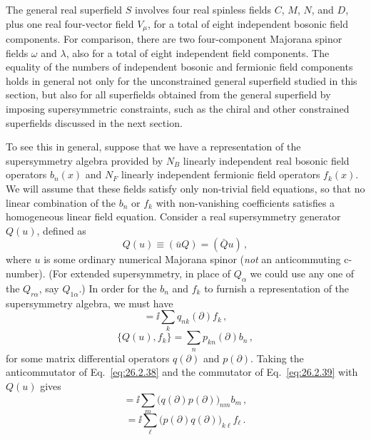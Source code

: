 The general real superfield $S$ involves four real spinless fields $C$, $M$,
$N$, and $D$, plus one real four-vector field $V_\mu$, for a total of eight
independent bosonic field components. For comparison, there are two
four-component Majorana spinor fields $\omega$ and $\lambda$, also for a total
of eight independent field components. The equality of the numbers of
independent bosonic and fermionic field components holds in general not only
for the unconstrained general superfield studied in this section, but also for
all superfields obtained from the general superfield by imposing
supersymmetric constraints, such as the chiral and other constrained
superfields discussed in the next section.

To see this in general, suppose that we have a representation of the
supersymmetry algebra provided by $N_B$ linearly independent real bosonic
field operators $b_n(x)$ and $N_F$ linearly independent fermionic field
operators $f_k(x)$. We will assume that these fields satisfy only non-trivial
field equations, so that no linear combination of the $b_n$ or $f_k$ with
non-vanishing coefficients satisfies a homogeneous linear field equation.
Consider a real supersymmetry generator $Q(u)$, defined as
\begin{equation}
  Q(u)\equiv(\bar uQ)=(\bar Qu)\,,
  \tag{26.2.37}\label{eq:26.2.37}
\end{equation}
where $u$ is some ordinary numerical Majorana spinor (\emph{not} an
anticommuting c-number). (For extended supersymmetry, in place of $Q_\alpha$
we could use any one of the $Q_{r\alpha}$, say $Q_{1\alpha}$.) In order for
the $b_n$ and $f_k$ to furnish a representation of the supersymmetry algebra,
we must have
\begin{equation}
  [Q(u),b_n]=\ii\sum_k q_{nk}(\partial)f_k\,,
  \tag{26.2.38}\label{eq:26.2.38}
\end{equation}
\begin{equation}
  \{Q(u),f_k\}=\sum_n p_{kn}(\partial)b_n\,,
  \tag{26.2.39}\label{eq:26.2.39}
\end{equation}
for some matrix differential operators $q(\partial)$ and $p(\partial)$.
Taking the anticommutator of Eq.~\eqref{eq:26.2.38} and the commutator of
Eq.~\eqref{eq:26.2.39} with $Q(u)$ gives
\begin{equation}
  [Q^2(u),b_n]
  =\ii\sum_m\bigl(q(\partial)p(\partial)\bigr)_{nm}b_m\,,
  \tag{26.2.40}\label{eq:26.2.40}
\end{equation}
\begin{equation}
  [Q^2(u),f_k]
  =\ii\sum_\ell\bigl(p(\partial)q(\partial)\bigr)_{k\ell}f_\ell\,.
  \tag{26.2.41}\label{eq:26.2.41}
\end{equation}
